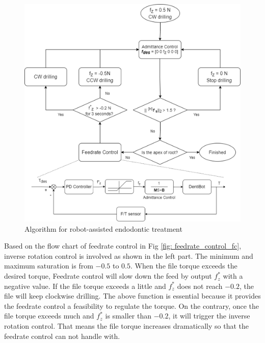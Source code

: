 \begin{figure}[htbp]
\begin{center}
\includegraphics[width=1\linewidth]{Images/algorithm.png}
\end{center}
\caption{
Algorithm for robot-assisted endodontic treatment
}\label{fig: complete_flowchart}
\end{figure}
\par
 Based on the flow chart of feedrate control in Fig \ref{fig: feedrate_control_fc}, inverse rotation control is involved as shown in the left part. The minimum and maximum saturation is from $-0.5$ to $0.5$. When the file torque exceeds the desired torque, Feedrate control will slow down the feed by output $f^*_z$ with a negative value. If  the file torque exceeds a little and $f^*_z$ does not reach $-0.2$, the file will keep clockwise drilling. The above function is essential because it provides the feedrate control a feasibility to regulate the torque.  On the contrary, once the file torque exceeds much and  $f^*_z$  is smaller than $-0.2$, it will trigger the inverse rotation control. That means the file torque increases dramatically so that the feedrate control can not handle with. 

